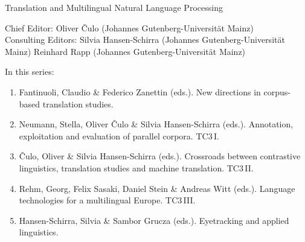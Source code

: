 {\large Translation and Multilingual Natural Language Processing}

\bigskip

Chief Editor: Oliver \v{C}ulo (Johannes Gutenberg-Universität Mainz) \\
Consulting Editors: Silvia Hansen-Schirra (Johannes Gutenberg-Universität Mainz)
Reinhard Rapp (Johannes Gutenberg-Universität Mainz)

\bigskip

In this series:

\begin{enumerate}
\item Fantinuoli, Claudio \& Federico Zanettin (eds.). New directions in corpus-based translation studies.
\item Neumann, Stella, Oliver Čulo \& Silvia Hansen-Schirra (eds.). Annotation, exploitation and evaluation of parallel corpora. TC3\,I.
\item Čulo, Oliver  \& Silvia Hansen-Schirra (eds.). Crossroads between contrastive linguistics, translation studies and machine translation. TC3\,II.
\item Rehm, Georg, Felix Sasaki, Daniel Stein \& Andreas Witt (eds.). Language technologies for a multilingual Europe. TC3\,III.
\item Hansen-Schirra, Silvia \& Sambor Grucza (eds.). Eyetracking and applied linguistics.
\end{enumerate}

 
